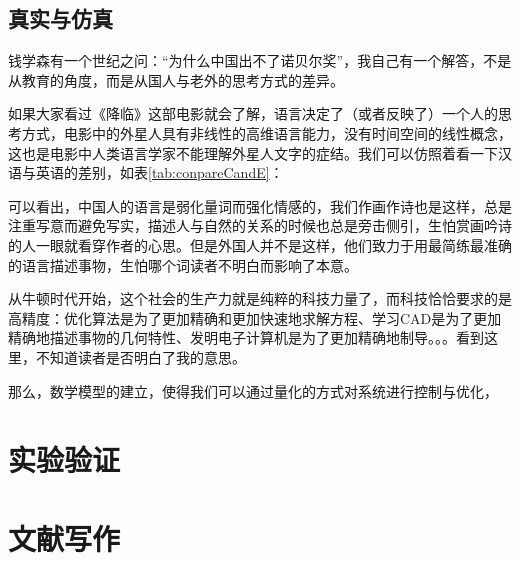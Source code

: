 \documentclass[UTF8]{ctexbook}
\begin{document}
\subsection{真实与仿真}
钱学森有一个世纪之问：“为什么中国出不了诺贝尔奖”，我自己有一个解答，不是从教育的角度，而是从国人与老外的思考方式的差异。

如果大家看过《降临》这部电影就会了解，语言决定了（或者反映了）一个人的思考方式，电影中的外星人具有非线性的高维语言能力，没有时间空间的线性概念，这也是电影中人类语言学家不能理解外星人文字的症结。我们可以仿照着看一下汉语与英语的差别，如表\ref{tab:conpareCandE}：

\begin{table}[!htb]
	\renewcommand{\arraystretch}{1.3} %
	\caption{中英对比}\label{tab:conpareCandE}
	\centering
	\vspace{0.2cm}
\end{table}

可以看出，中国人的语言是弱化量词而强化情感的，我们作画作诗也是这样，总是注重写意而避免写实，描述人与自然的关系的时候也总是旁击侧引，生怕赏画吟诗的人一眼就看穿作者的心思。但是外国人并不是这样，他们致力于用最简练最准确的语言描述事物，生怕哪个词读者不明白而影响了本意。

从牛顿时代开始，这个社会的生产力就是纯粹的科技力量了，而科技恰恰要求的是高精度：优化算法是为了更加精确和更加快速地求解方程、学习CAD是为了更加精确地描述事物的几何特性、发明电子计算机是为了更加精确地制导。。。看到这里，不知道读者是否明白了我的意思。

那么，数学模型的建立，使得我们可以通过量化的方式对系统进行控制与优化，

\section{实验验证}

\section{文献写作}
\end{document}

